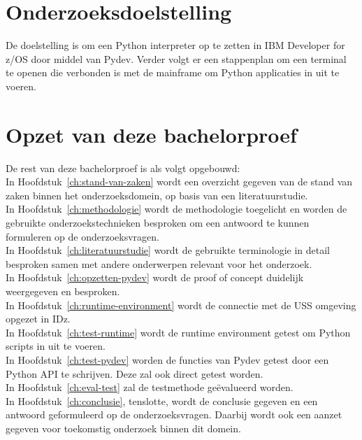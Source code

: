 \section{Onderzoeksdoelstelling}%
\label{sec:onderzoeksdoelstelling}
De doelstelling is om een Python interpreter op te zetten in IBM Developer for z/OS door middel van Pydev. Verder volgt er een stappenplan om een terminal te openen die verbonden is met de mainframe om Python applicaties in uit te voeren.

\section{Opzet van deze bachelorproef}%
\label{sec:opzet-bachelorproef}


De rest van deze bachelorproef is als volgt opgebouwd: \\

In Hoofdstuk~\ref{ch:stand-van-zaken} wordt een overzicht gegeven van de stand van zaken binnen het onderzoeksdomein, op basis van een literatuurstudie. \\

In Hoofdstuk~\ref{ch:methodologie} wordt de methodologie toegelicht en worden de gebruikte onderzoekstechnieken besproken om een antwoord te kunnen formuleren op de onderzoeksvragen. \\

In Hoofdstuk~\ref{ch:literatuurstudie} wordt de gebruikte terminologie in detail besproken samen met andere onderwerpen relevant voor het onderzoek. \\

In Hoofdstuk~\ref{ch:opzetten-pydev} wordt de proof of concept duidelijk weergegeven en besproken. \\

In Hoofdstuk~\ref{ch:runtime-environment} wordt de connectie met de USS omgeving opgezet in IDz. \\

In Hoofdstuk~\ref{ch:test-runtime} wordt de runtime environment getest om Python scripts in uit te voeren. \\

In Hoofdstuk~\ref{ch:test-pydev} worden de functies van Pydev getest door een Python API te schrijven. Deze zal ook direct getest worden. \\

In Hoofdstuk~\ref{ch:eval-test} zal de testmethode geëvalueerd worden. \\

In Hoofdstuk~\ref{ch:conclusie}, tenslotte, wordt de conclusie gegeven en een antwoord geformuleerd op de onderzoeksvragen. Daarbij wordt ook een aanzet gegeven voor toekomstig onderzoek binnen dit domein.